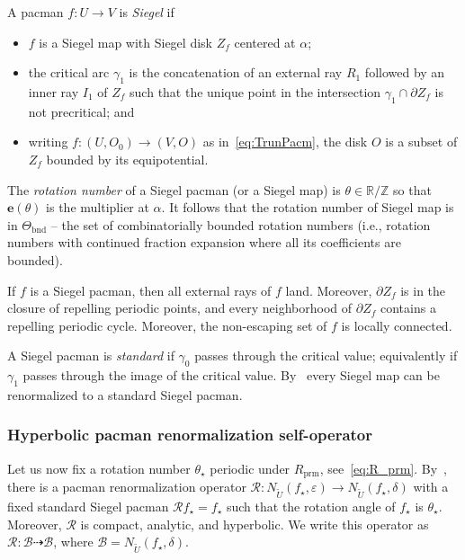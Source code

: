\documentclass{amsart}
\newcommand{\1}{{\mathbb 1 }}
\newcommand\RR{\mathcal{R}}
\newcommand\prm{{\operatorname{prm}}}
\newcommand\cRRc{R_{\prm}}%
\newcommand{\str}{{\star}}
\newcommand{\ee}{\mathbf e}
\newcommand\BB{\mathcal{B}}
\newcommand{\R}{\mathbb{R}}
\newcommand{\Z}{\mathbb{Z}}
\theoremstyle{remark}
\numberwithin{equation}{section}
\theoremstyle{definition}
\newcommand{\bnd}{{\mathrm{bnd}}}
\theoremstyle{nonumberbreak}
\begin{document}
A pacman $f:U\to V$ is \emph{Siegel} if 
\begin{itemize}
\item $f$ is a Siegel map with Siegel disk $Z_f$ centered at $\alpha$;
\item the critical arc $\gamma_1$ is the concatenation of an external ray $R_1$ followed by an inner ray $I_1$ of $Z_f$ such that the unique point in the intersection $\gamma_1\cap \partial Z_f$ is not precritical;  and
\item writing $f\colon (U, O_0)\to (V,O)$ as in~\eqref{eq:TrunPacm}, the disk  $O $ is a subset of $Z_f$ bounded by its equipotential.
\end{itemize}
The \emph{rotation number} of a Siegel pacman (or a Siegel map)
 is $\theta \in \R/\Z$ so that $\ee(\theta)$ is the multiplier at $\alpha$. It follows that the rotation number of Siegel map is in $ \Theta_\bnd$ -- the set of combinatorially bounded rotation numbers (i.e., rotation numbers with continued fraction expansion where all its coefficients are bounded).
 
 
 If $f$ is a Siegel pacman, then all external rays of $f$ land. Moreover, $\partial Z_f$ is in the closure of repelling periodic points, and every neighborhood of $\partial Z_f$ contains a repelling periodic cycle. Moreover, the non-escaping set of $f$ is locally connected.

A Siegel pacman is \emph{standard} if $\gamma_0$ passes through the critical value; equivalently if $\gamma_1$ passes through the image of the critical value. By~\cite[Corollary 3.7 and Lemma 3.4]{DLS} every Siegel map can be renormalized to a standard Siegel pacman. 


\subsubsection{Hyperbolic pacman renormalization self-operator}\label{sss:HypSelfOper} 
Let us now fix a rotation number $\theta_\str$ periodic under $\cRRc$, see~\eqref{eq:R_prm}. By~\cite[Theorems 3.16 and 7.7]{DLS}, there is a pacman renormalization operator $\RR\colon N_{\widetilde U}(f_\str,\varepsilon)\to N_{\widetilde U}(f_\str,\delta)$ 
with a fixed standard Siegel pacman $\RR f_\str =f_\str$ such that the rotation angle of $f_\str$ is $\theta_\str$. Moreover, $\RR$ is compact, analytic, and hyperbolic. We write this operator as $\RR\colon \BB \dashrightarrow \BB$, where $\BB=N_{\widetilde U}(f_\str,\delta)$.
\end{document}
